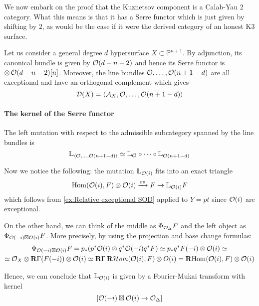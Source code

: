 We now embark on the proof that the Kuznetsov component is a Calab-Yau 2 category. What this means is that it has a Serre functor which is just given by shifting by $2$, as would be the case if it were the derived category of an honest K3 surface.

    

Let us consider a general degree $d$ hypersurface $X \subset \mathbb{P}^{n+1}$. By adjunction, its canonical bundle is given by $\mathcal{O}(d-n-2)$ and hence its Serre functor is $\otimes \,\mathcal{O}(d-n-2)[n] $. Moreover, the line bundles $\mathcal{O},\dots,\mathcal{O}(n+1-d)$ are all exceptional and have an orthogonal complement which gives $$\mathcal{D}(X)=\langle \mathcal{A}_X,\mathcal{O},\dots,\mathcal{O}(n+1-d) \rangle $$

\paragraph*{The kernel of the Serre functor}

The left mutation with respect to the admissible subcategory spanned by the line bundles is $$\mathbb{L}_{\langle \mathcal{O}, \dots, \mathcal{O}(n+1-d) \rangle}\simeq \mathbb{L}_{\mathcal{O}} \circ \dots \circ \mathbb{L}_{\mathcal{O}(n+1-d)}$$

Now we notice the following: the mutation $\mathbb{L}_{\mathcal{O}(i)}$ fits into an exact triangle $$\operatorname{Hom}(\mathcal{O}(i), F)\otimes \mathcal{O}(i) \xrightarrow{ev} F \rightarrow \mathbb{L}_{\mathcal{O}(i)} F$$
which follows from \ref{ex:Relative exceptional SOD} applied to $Y=pt$ since $\mathcal{O}(i)$ are exceptional.


On the other hand, we can think of the middle as $\Phi_{\mathcal{O}_\Delta}F$ and the left object as $\Phi_{\mathcal{O}(-i)\boxtimes \mathcal{O}(i)}F$. More precisely, by using the projection and base change formulas:
\begin{gather*}
    \Phi_{\mathcal{O}(-i)\boxtimes \mathcal{O}(i)}F=p_* (p^*\mathcal{O}(i)\otimes q^* \mathcal{O}(-i)q^*F)\simeq p_* q^* F(-i)\otimes \mathcal{O}(i)\simeq\\
    \simeq \mathcal{O}_X \otimes \operatorname{\mathbf{R}\Gamma} (F(-i))\otimes \mathcal{O}(i)\simeq \operatorname{\mathbf{R}\Gamma} \operatorname{\mathbf{R}\mathcal{H}\mathit{om}}(\mathcal{O}(i),F) \otimes O(i)=\operatorname{\mathbf{R} Hom}(\mathcal{O}(i),F) \otimes \mathcal{O}(i)
\end{gather*}

Hence, we can conclude that $\mathbb{L}_{\mathcal{O}(i)}$ is given by a Fourier-Mukai transform with kernel $$[\mathcal{O}(-i)\boxtimes \mathcal{O}(i)\rightarrow \mathcal{O}_\Delta]$$

